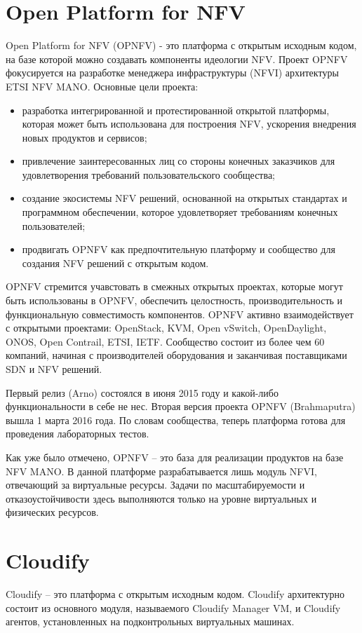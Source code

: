 \documentclass[oneside,final,14pt,a4paper]{extreport}
\begin{document}
\section{Open Platform for NFV}
Open Platform for NFV (OPNFV) - это платформа с открытым исходным кодом, на базе которой можно создавать компоненты  идеологии NFV. Проект OPNFV фокусируется на разработке менеджера инфраструктуры (NFVI) архитектуры ETSI NFV MANO\cite{opnfv-official}. Основные цели проекта:
\begin{itemize}
	\item разработка интегрированной и протестированной открытой платформы, которая может быть использована для построения NFV, ускорения внедрения новых продуктов и сервисов;
	\item привлечение заинтересованных лиц со стороны конечных заказчиков для удовлетворения требований пользовательского сообщества;
	\item создание экосистемы NFV решений, основанной на открытых стандартах и программном обеспечении, которое удовлетворяет требованиям конечных пользователей;
	\item продвигать OPNFV как предпочтительную платформу и сообщество для создания NFV решений с открытым кодом.
\end{itemize}

OPNFV стремится учавстовать в смежных открытых проектах, которые могут быть использованы в OPNFV, обеспечить целостность, производительность и функциональную совместимость компонентов. OPNFV активно взаимодействует с открытыми проектами: OpenStack, KVM, Open vSwitch, OpenDaylight, ONOS, Open Contrail, ETSI, IETF. Сообщество состоит из более чем 60 компаний, начиная с производителей оборудования и заканчивая поставщиками SDN и NFV решений.\cite{opnfv-state1}

Первый релиз (Arno) состоялся в июня 2015 году и какой-либо функциональности в себе не нес. Вторая версия проекта OPNFV (Brahmaputra) вышла 1 марта 2016 года. По словам сообщества, теперь платформа готова для проведения лабораторных тестов.

Как уже было отмечено, OPNFV -- это база для реализации продуктов на базе NFV MANO. В данной платформе разрабатывается лишь модуль NFVI, отвечающий за виртуальные ресурсы. Задачи по масштабируемости и отказоустойчивости здесь выполняются только на уровне виртуальных и физических ресурсов.


\section{Cloudify}
Cloudify -- это платформа с открытым исходным кодом. Cloudify архитектурно состоит из основного модуля, называемого Cloudify Manager VM, и Cloudify агентов, установленных на подконтрольных виртуальных машинах. 
\end{document}
